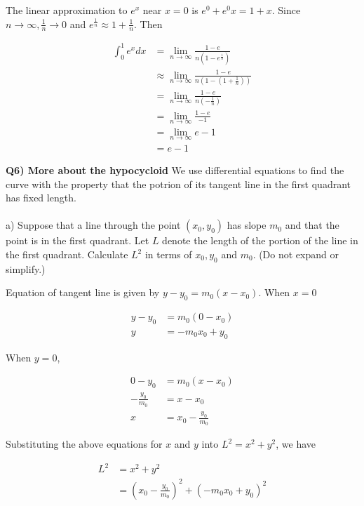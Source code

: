 \documentclass[9pt]{article}
\begin{document}
The linear approximation to $e^x$ near $x = 0$ is $e^0 + e^0 x = 1 + x$. Since $n \rightarrow \infty, \frac{1}{n} \rightarrow 0$ and $e^{\frac{1}{n}} \approx 1 + \frac{1}{n}$. Then

\begin{align*}
  \int_{0}^{1} e^x dx &= \lim\limits_{n \to \infty} \frac{1 - e}{n(1 - e^{\frac{1}{n}})}\\
                      &\approx \lim\limits_{n \to \infty} \frac{1 - e}{n(1 - (1 + \frac{1}{n}))}\\
                      &= \lim\limits_{n \to \infty} \frac{1 - e}{n(-\frac{1}{n})}\\
                      &= \lim\limits_{n \to \infty} \frac{1 - e}{-1}\\
                      &= \lim\limits_{n \to \infty} e - 1\\
                      &= e - 1
\end{align*}


\begin{tcolorbox}
  \textbf{Q6) More about the hypocycloid} We use differential equations to find the curve with the property that the potrion of its tangent line in the first quadrant has fixed length.\\
  \\
  a) Suppose that a line through the point $(x_0, y_0)$ has slope $m_0$ and that the point is in the first quadrant. Let $L$ denote the length of the portion of the line in the first quadrant. Calculate $L^2$ in terms of $x_0, y_0$ and $m_0$. (Do not expand or simplify.)
\end{tcolorbox}

Equation of tangent line is given by $y - y_0 = m_0(x - x_0)$. When $x = 0$

\begin{align*}
  y - y_0 &= m_0(0 - x_0)\\
  y &= -m_0 x_0 + y_0
\end{align*}

When $y = 0$,

\begin{align*}
  0 - y_0 &= m_0(x - x_0)\\
  -\frac{y_0}{m_0} &= x - x_0\\
  x &= x_0 - \frac{y_0}{m_0}
\end{align*}

Substituting the above equations for $x$ and $y$ into $L^2 = x^2 + y^2$, we have

\begin{align*}
  L^2 &= x^2 + y^2\\
      &= (x_0 - \frac{y_0}{m_0})^2 + (-m_0 x_0 + y_0)^2
\end{align*}
\end{document}
